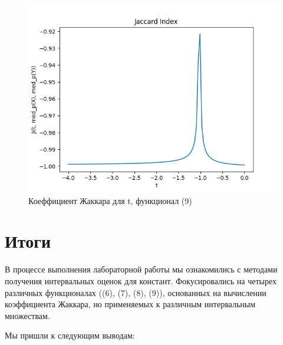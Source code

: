\documentclass[10pt]{article}
\begin{document}
\newpage
\begin{figure}[h!]
    \centering
    \includegraphics[width=0.75\linewidth]{Jaccadrd-t-med_p.png}
    \caption{Коеффициент Жаккара для t, функционал (9)}
\end{figure}

\section{Итоги}

В процессе выполнения лабораторной работы мы ознакомились с методами получения интервальных оценок для констант. Фокусировались на четырех различных функционалах ((6), (7), (8), (9)), основанных на вычислении коэффициента Жаккара, но применяемых к различным интервальным множествам.

Мы пришли к следующим выводам:
\end{document}

